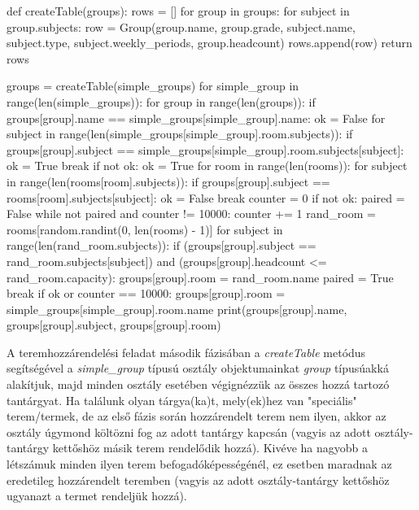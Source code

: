 \documentclass[a4paper,12pt]{article}
\begin{document}
\begin{python}
def createTable(groups):
    rows = []
    for group in groups:
        for subject in group.subjects:
            row = Group(group.name, group.grade, subject.name, subject.type, subject.weekly_periods, group.headcount)
            rows.append(row)
    return rows


groups = createTable(simple_groups)
for simple_group in range(len(simple_groups)):
    for group in range(len(groups)):
        if groups[group].name == simple_groups[simple_group].name:
            ok = False
            for subject in range(len(simple_groups[simple_group].room.subjects)):
                if groups[group].subject == simple_groups[simple_group].room.subjects[subject]:
                    ok = True
                    break
            if not ok:
                ok = True
                for room in range(len(rooms)):
                    for subject in range(len(rooms[room].subjects)):
                        if groups[group].subject == rooms[room].subjects[subject]:
                            ok = False
                            break
            counter = 0
            if not ok:
                paired = False
                while not paired and counter != 10000:
                    counter += 1
                    rand_room = rooms[random.randint(0, len(rooms) - 1)]
                    for subject in range(len(rand_room.subjects)):
                        if (groups[group].subject == rand_room.subjects[subject]) and (groups[group].headcount <= rand_room.capacity):
                            groups[group].room = rand_room.name
                            paired = True
                            break
            if ok or counter == 10000:
                groups[group].room = simple_groups[simple_group].room.name
            print(groups[group].name, groups[group].subject, groups[group].room)
\end{python}

A teremhozzárendelési feladat második fázisában a \textsl{createTable} metódus segítségével a \textsl{simple_group} típusú osztály objektumainkat \textsl{group} típusúakká alakítjuk, majd minden osztály esetében végignézzük az összes hozzá tartozó tantárgyat. Ha találunk olyan tárgya(ka)t, mely(ek)hez van "speciális" terem/termek, de az első fázis során hozzárendelt terem nem ilyen, akkor az osztály úgymond költözni fog az adott tantárgy kapcsán (vagyis az adott osztály-tantárgy kettőshöz másik terem rendelődik hozzá). Kivéve ha nagyobb a létszámuk minden ilyen terem befogadóképességénél, ez esetben maradnak az eredetileg hozzárendelt teremben (vagyis az adott osztály-tantárgy kettőshöz ugyanazt a termet rendeljük hozzá).
\end{document}
